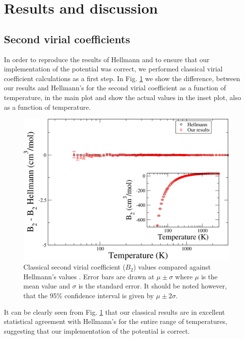 \section{Results and discussion}
    \subsection{Second virial coefficients}
        In order to reproduce the results of Hellmann and to ensure that our implementation of the \abinitio{} potential was correct, we performed classical virial coefficient calculations as a first step. In Fig. \ref{fig:B2CLN2} we show the difference, between our results and Hellmann's for the second virial coefficient as a function of temperature, in the main plot and show the actual values in the inset plot, also as a function of temperature.
        \begin{figure}[!htbp]
            \centering
            \includegraphics[scale=0.20,keepaspectratio]{Chapter-5/Figures/B2CL9sResultsAll.png}
            \caption{Classical second virial coefficient ($B_2$) values compared against Hellmann's values \cite{Hellmann2013}. Error bars are drawn at $\mu \pm \sigma$ where $\mu$ is the mean value and $\sigma$ is the standard error. It should be noted however, that the 95\% confidence interval is given by $\mu \pm 2\sigma$.}
            \label{fig:B2CLN2}
        \end{figure}
        It can be clearly seen from Fig. \ref{fig:B2CLN2} that our classical results are in excellent statistical agreement with Hellmann's for the entire range of temperatures, suggesting that our implementation of the \abinitio{} potential is correct.

